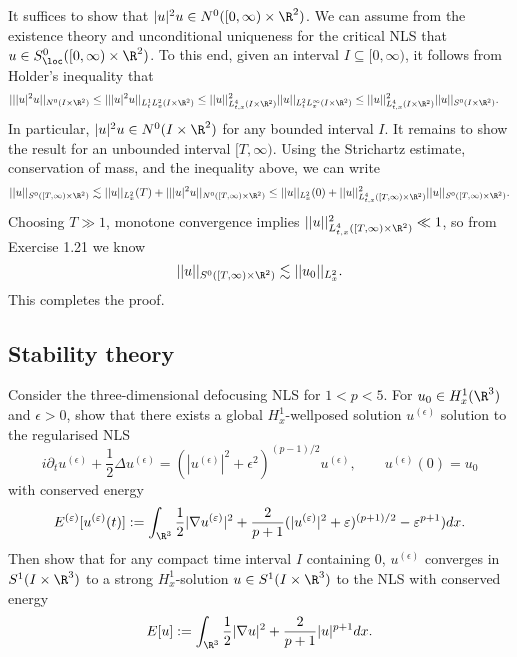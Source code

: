 \begin{solution}
	It suffices to show that $|u|^2 u \in N^0 ([0, \infty) \times \R^2)$. We can assume from the existence theory and unconditional uniqueness for the critical NLS that $u \in S^0_{\loc} ([0, \infty) \times \R^2)$. To this end, given an interval $I \subseteq [0, \infty)$, it follows from Holder's inequality that
		\begin{align*}
			|| |u|^2 u||_{N^0 (I \times \R^2)}
				&\leq || |u|^2 u||_{L^1_t L^2_x (I \times \R^2)} \leq || u ||_{L^4_{t, x} (I \times \R^2)}^2 ||u||_{L^2_t L^\infty_x (I \times \R^2)} \leq ||u||^2_{L^4_{t, x} (I \times \R^2)} ||u||_{S^0 (I \times \R^2)}.
		\end{align*}
	In particular, $|u|^2 u \in N^0 (I \times \R^2)$ for any bounded interval $I$. It remains to show the result for an unbounded interval $[T, \infty)$. Using the Strichartz estimate, conservation of mass, and the inequality above, we can write 
		\[ ||u||_{S^0 ([T, \infty) \times \R^2)} \lesssim ||u||_{L^2_x} (T) + || |u|^2 u||_{N^0 ([T, \infty) \times \R^2)} \leq  ||u||_{L^2_x} (0) + ||u||^2_{L^4_{t, x} ([T, \infty) \times \R^2)} ||u||_{S^0 ([T, \infty) \times \R^2)}.  \]		
	Choosing $T \gg 1$, monotone convergence implies $||u||^2_{L^4_{t, x} ([T, \infty) \times \R^2)} \ll 1$, so from Exercise 1.21 we know
		\[ ||u||_{S^0 ([T, \infty) \times \R^2)} \lesssim ||u_0||_{L^2_x}. \]
	This completes the proof. 	
\end{solution}

\subsection{Stability theory}

\begin{statement}
	Consider the three-dimensional defocusing NLS for $1 < p < 5$. For $u_0 \in H^1_x (\R^3)$ and $\epsilon > 0$, show that there exists a global $H^1_x$-wellposed solution $u^{(\epsilon)}$ solution to the regularised NLS
		\[ i \partial_t u^{(\epsilon)} + \frac12 \Delta u^{(\epsilon)} = (|u^{(\epsilon)}|^2 + \epsilon^2)^{(p - 1)/2} u^{(\epsilon)}, \qquad u^{(\epsilon)} (0) = u_0 \]
	with conserved energy 
		\[ E^{(\epsilon)} [u^{(\epsilon)} (t)] := \int_{\R^3} \frac12 |\nabla u^{(\epsilon)}|^2 + \frac{2}{p + 1} (|u^{(\epsilon)} |^2 + \epsilon )^{(p + 1)/2}   - \epsilon^{p + 1}) dx. \]
	Then show that for any compact time interval $I$ containing $0$, $u^{(\epsilon)}$ converges in $S^1 (I \times \R^3)$ to a strong $H^1_x$-solution $u \in S^1 (I \times \R^3)$ to the NLS with conserved energy
		\[ E[u] := \int_{\R^3} \frac12 |\nabla u |^2 + \frac{2}{p + 1} |u|^{p + 1} dx. \]		
\end{statement}

